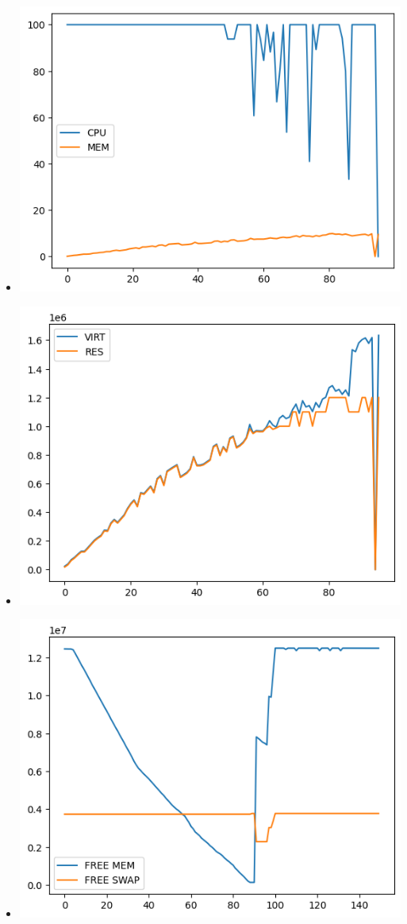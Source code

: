 \documentclass[10pt, a4paper]{article}
\begin{document}
\begin{itemize}
    \item \includegraphics[scale=0.8]{graphs/11.png}
    \item \includegraphics[scale=0.8]{graphs/12.png}
    \item \includegraphics[scale=0.8]{graphs/13.png}
\end{itemize}
\end{document}

